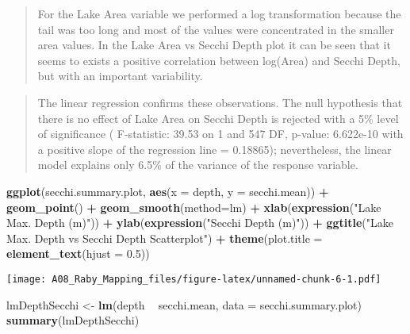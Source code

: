 \documentclass[]{article}
\newenvironment{Shaded}{\begin{snugshade}}{\end{snugshade}}
\newcommand{\DataTypeTok}[1]{\textcolor[rgb]{0.13,0.29,0.53}{#1}}
\newcommand{\FloatTok}[1]{\textcolor[rgb]{0.00,0.00,0.81}{#1}}
\newcommand{\KeywordTok}[1]{\textcolor[rgb]{0.13,0.29,0.53}{\textbf{#1}}}
\newcommand{\NormalTok}[1]{#1}
\newcommand{\OperatorTok}[1]{\textcolor[rgb]{0.81,0.36,0.00}{\textbf{#1}}}
\newcommand{\StringTok}[1]{\textcolor[rgb]{0.31,0.60,0.02}{#1}}
\begin{document}
\begin{quote}
For the Lake Area variable we performed a log transformation because the
tail was too long and most of the values were concentrated in the
smaller area values. In the Lake Area vs Secchi Depth plot it can be
seen that it seems to exists a positive correlation between log(Area)
and Secchi Depth, but with an important variability.
\end{quote}

\begin{quote}
The linear regression confirms these observations. The null hypothesis
that there is no effect of Lake Area on Secchi Depth is rejected with a
5\% level of significance ( F-statistic: 39.53 on 1 and 547 DF, p-value:
6.622e-10 with a positive slope of the regression line = 0.18865);
nevertheless, the linear model explains only 6.5\% of the variance of
the response variable.
\end{quote}

\begin{Shaded}
\begin{Highlighting}[]
\KeywordTok{ggplot}\NormalTok{(secchi.summary.plot, }\KeywordTok{aes}\NormalTok{(}\DataTypeTok{x =}\NormalTok{ depth, }\DataTypeTok{y =}\NormalTok{ secchi.mean)) }\OperatorTok{+}
\StringTok{  }\KeywordTok{geom_point}\NormalTok{() }\OperatorTok{+}
\StringTok{  }\KeywordTok{geom_smooth}\NormalTok{(}\DataTypeTok{method=}\NormalTok{lm) }\OperatorTok{+}
\StringTok{  }\KeywordTok{xlab}\NormalTok{(}\KeywordTok{expression}\NormalTok{(}\StringTok{"Lake Max. Depth (m)"}\NormalTok{)) }\OperatorTok{+}
\StringTok{  }\KeywordTok{ylab}\NormalTok{(}\KeywordTok{expression}\NormalTok{(}\StringTok{"Secchi Depth (m)"}\NormalTok{)) }\OperatorTok{+}
\StringTok{  }\KeywordTok{ggtitle}\NormalTok{(}\StringTok{"Lake Max. Depth vs Secchi Depth Scatterplot"}\NormalTok{) }\OperatorTok{+}
\StringTok{  }\KeywordTok{theme}\NormalTok{(}\DataTypeTok{plot.title =} \KeywordTok{element_text}\NormalTok{(}\DataTypeTok{hjust =} \FloatTok{0.5}\NormalTok{))}
\end{Highlighting}
\end{Shaded}

\texttt{[image: A08\_Raby\_Mapping\_files/figure-latex/unnamed-chunk-6-1.pdf]}

\begin{Shaded}
\begin{Highlighting}[]
\NormalTok{lmDepthSecchi <-}\StringTok{ }\KeywordTok{lm}\NormalTok{(depth }\OperatorTok{~}\StringTok{ }\NormalTok{secchi.mean, }\DataTypeTok{data =}\NormalTok{ secchi.summary.plot)}
\KeywordTok{summary}\NormalTok{(lmDepthSecchi)}
\end{Highlighting}
\end{Shaded}
\end{document}
